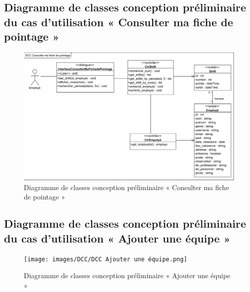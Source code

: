         \subsection*{Diagramme de classes conception préliminaire du cas d'utilisation « Consulter ma fiche de pointage »}
        \begin{figure}[h!]
                 \centering
                \includegraphics[scale=0.77]{images/DCC/DCC Consulter ma fiche de pointage.png}
                 \caption{Diagramme de classes conception préliminaire « Consulter ma fiche de pointage »}
                 \label{fig42}
        \end{figure}
        


        \subsection*{Diagramme de classes conception préliminaire du cas d'utilisation « Ajouter une équipe »}
        \clearpage
        \begin{figure}[h!]
                 \centering
                \texttt{[image: images/DCC/DCC Ajouter une équipe.png]}
                 \caption{Diagramme de classes conception préliminaire « Ajouter une équipe »}
                 \label{fig43}
        \end{figure}
        
        

